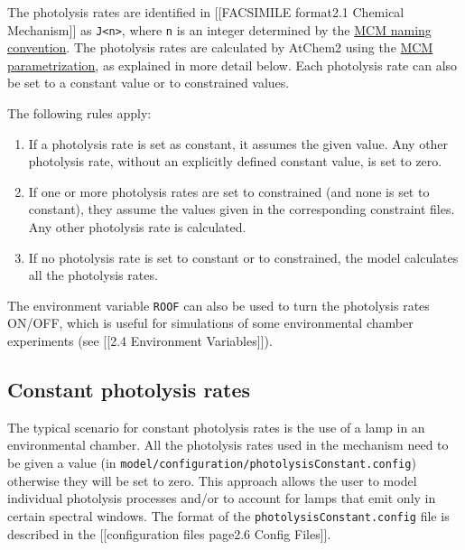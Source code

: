 The photolysis rates are identified in {[}{[}FACSIMILE
format\textbar{}2.1 Chemical Mechanism{]}{]} as
\texttt{J\textless{}n\textgreater{}}, where \texttt{n} is an integer
determined by the
\href{http://mcm.leeds.ac.uk/MCMv3.3.1/parameters/photolysis.htt}{MCM
naming convention}. The photolysis rates are calculated by AtChem2 using
the
\href{http://mcm.leeds.ac.uk/MCM/parameters/photolysis_param.htt}{MCM
parametrization}, as explained in more detail below. Each photolysis
rate can also be set to a constant value or to constrained values.

The following rules apply:

\begin{enumerate}
\def\labelenumi{\arabic{enumi}.}
\tightlist
\item
  If a photolysis rate is set as constant, it assumes the given value.
  Any other photolysis rate, without an explicitly defined constant
  value, is set to zero.
\item
  If one or more photolysis rates are set to constrained (and none is
  set to constant), they assume the values given in the corresponding
  constraint files. Any other photolysis rate is calculated.
\item
  If no photolysis rate is set to constant or to constrained, the model
  calculates all the photolysis rates.
\end{enumerate}

The environment variable \texttt{ROOF} can also be used to turn the
photolysis rates ON/OFF, which is useful for simulations of some
environmental chamber experiments (see {[}{[}2.4 Environment
Variables{]}{]}).

\hypertarget{constant-photolysis-rates}{%
\subsection{Constant photolysis rates}\label{constant-photolysis-rates}}

The typical scenario for constant photolysis rates is the use of a lamp
in an environmental chamber. All the photolysis rates used in the
mechanism need to be given a value (in
\texttt{model/configuration/photolysisConstant.config}) otherwise they
will be set to zero. This approach allows the user to model individual
photolysis processes and/or to account for lamps that emit only in
certain spectral windows. The format of the
\texttt{photolysisConstant.config} file is described in the
{[}{[}configuration files page\textbar{}2.6 Config Files{]}{]}.

